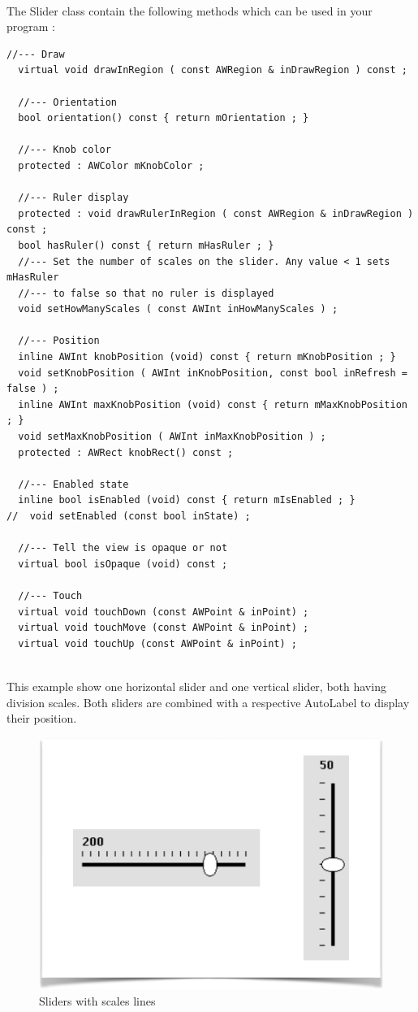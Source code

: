 \documentclass[a4paper,11pt]{extarticle}
\begin{document}
~\\ The Slider class contain the following methods which can be used in your program :

\begin{lstlisting}[language=Arduinonl]
  //--- Draw
  virtual void drawInRegion ( const AWRegion & inDrawRegion ) const ;
   
  //--- Orientation
  bool orientation() const { return mOrientation ; }
  
  //--- Knob color
  protected : AWColor mKnobColor ;
  
  //--- Ruler display
  protected : void drawRulerInRegion ( const AWRegion & inDrawRegion ) const ;
  bool hasRuler() const { return mHasRuler ; }
  //--- Set the number of scales on the slider. Any value < 1 sets mHasRuler
  //--- to false so that no ruler is displayed
  void setHowManyScales ( const AWInt inHowManyScales ) ;
  
  //--- Position
  inline AWInt knobPosition (void) const { return mKnobPosition ; }
  void setKnobPosition ( AWInt inKnobPosition, const bool inRefresh = false ) ;
  inline AWInt maxKnobPosition (void) const { return mMaxKnobPosition ; }
  void setMaxKnobPosition ( AWInt inMaxKnobPosition ) ;
  protected : AWRect knobRect() const ;
  
  //--- Enabled state
  inline bool isEnabled (void) const { return mIsEnabled ; }
//  void setEnabled (const bool inState) ;
  
  //--- Tell the view is opaque or not
  virtual bool isOpaque (void) const ;
  
  //--- Touch
  virtual void touchDown (const AWPoint & inPoint) ;
  virtual void touchMove (const AWPoint & inPoint) ;
  virtual void touchUp (const AWPoint & inPoint) ;
\end{lstlisting}

~\\ This example show one horizontal slider and one vertical slider, both having division scales. Both sliders are combined with a respective AutoLabel to display their position.

\begin{figure}[htbp]
   \centering
   \includegraphics[scale=0.7]{AWFig121.png} 
   \caption{Sliders with scales lines}
   \label{fig:121 }
\end{figure}
\end{document}
